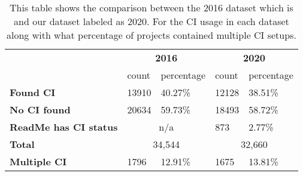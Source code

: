 \begin{table}[!ht]
    \begin{tabular}{l|l|l|l|l|}
    \cline{2-5}
                                                & \multicolumn{2}{c|}{\textbf{2016}} & \multicolumn{2}{c|}{\textbf{2020}} \\ \cline{2-5} 
                                                & count         & percentage         & count         & percentage         \\ \hline
    \multicolumn{1}{|l|}{\textbf{Found CI}}          & 13910         & 40.27\%            & 12128         & 38.51\%            \\ \hline
    \multicolumn{1}{|l|}{\textbf{No CI found}}       & 20634         & 59.73\%            & 18493         & 58.72\%            \\ \hline
    \multicolumn{1}{|l|}{\textbf{ReadMe has CI status}}      & \multicolumn{2}{c|}{n/a}           & 873           & 2.77\%             \\ \hline
    \multicolumn{1}{|l|}{\textbf{Total}}      & \multicolumn{2}{c|}{34,544}           & \multicolumn{2}{c|}{32,660}             \\ \hline
    \multicolumn{1}{|l|}{\textbf{Multiple CI}} & 1796          & 12.91\%            & 1675          & 13.81\%            \\ \hline

    \end{tabular}
    \label{table:comparison_dataset}

    \caption{This table shows the comparison between the 2016 dataset which is\citet{Hilton2016} and our dataset labeled as 2020. For the CI usage in each dataset along with what percentage of projects contained multiple CI setups.}
\end{table}